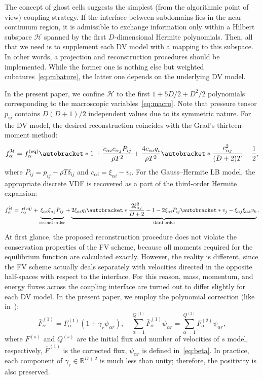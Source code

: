 \documentclass[]{elsarticle} %
\DeclarePairedDelimiter\autobracket()       %
\newcommand{\br}[1]{\autobracket*{#1}}
\newcommand{\xiai}{\xi_{\alpha i}}
\newcommand{\xiaj}{\xi_{\alpha j}}
\newcommand{\xiak}{\xi_{\alpha k}}
\newcommand{\cai}{c_{\alpha i}}
\newcommand{\caj}{c_{\alpha j}}
\newcommand{\equil}[1]{#1^\mathrm{(eq)}}
\begin{document}
{%
The concept of ghost cells suggests the simplest (from the algorithmic point of view) coupling strategy.
If the interface between subdomains lies in the near-continuum region,
it is admissible to exchange information only within a Hilbert subspace \(\mathcal{H}\)
spanned by the first \(D\)-dimensional Hermite polynomials.
Then, all that we need is to supplement each DV model with a mapping to this subspace.
In other words, a projection and reconstruction procedures should be implemented.
While the former one is nothing else but weighted cubatures~\eqref{eq:cubature},
the latter one depends on the underlying DV model.

In the present paper, we confine \(\mathcal{H}\) to the first \(1+5D/2+D^2/2\) polynomials
corresponding to the macroscopic variables~\eqref{eq:macro}.
Note that pressure tensor \(p_{ij}\) contains \(D(D+1)/2\) independent values due to its symmetric nature.
For the DV model, the desired reconstruction coincides with the Grad's thirteen-moment method:
\begin{equation}\label{eq:interface_dvm}
    f^{\mathcal{H}}_\alpha = \equil{f}_\alpha\br{
        1 + \frac{\cai\caj P_{ij}}{\rho T^2} + \frac{4\cai q_i}{\rho T^2}\br{\frac{\caj^2}{(D+2)T} - \frac12} },
\end{equation}
where \(P_{ij} = p_{ij} - \rho T\delta_{ij}\) and \(\cai = \xiai - v_i\).
For the Gauss--Hermite LB model, the appropriate discrete VDF is recovered as a part of the third-order Hermite expansion:
\begin{equation}\label{eq:interface_lbm}
    f^{\mathcal{H}}_\alpha = \equil{f}_\alpha + \underbrace{ \vphantom{ \br{\frac{2\xiaj^2}{D+2}-1} }
        \xiai\xiaj P_{ij}
    }_\text{second order} + \underbrace{
        2\xiai q_i\br{\frac{2\xiaj^2}{D+2}-1} - 2\xiai P_{ij}\br{ v_j - \xiaj\xiak v_k }
    }_\text{third order}.
\end{equation}

At first glance, the proposed reconstruction procedure does not violate the conservation properties of the FV scheme,
because all moments required for the equilibrium function are calculated exactly.
However, the reality is different, since the FV scheme actually deals separately
with velocities directed in the opposite half-spaces with respect to the interface.
For this reason, mass, momentum, and energy fluxes across the coupling interface
are turned out to differ slightly for each DV model.
In the present paper, we employ the polynomial correction (like in~\cite{Aristov1980}):
\begin{equation}\label{eq:poly_correction}
    \bar{F}^{(1)}_\alpha = F^{(1)}_\alpha(1+\gamma_r\psi_{\alpha r}), \quad
    \sum_{\alpha=1}^{Q^{(1)}} \bar{F}^{(1)}_\alpha\psi_{\alpha r} = \sum_{\alpha=1}^{Q^{(2)}} F^{(2)}_\alpha\psi_{\alpha r},
\end{equation}
where \(F^{(s)}\) and \(Q^{(s)}\) are the initial flux and number of velocities of \(s\) model, respectively,
\(\bar{F}^{(1)}\) is the corrected flux, \(\psi_{\alpha r}\) is defined in~\eqref{eq:beta}.
In practice, each component of \(\gamma_r\in\mathbb{R}^{D+2}\) is much less than unity;
therefore, the positivity is also preserved.

}
\end{document}
